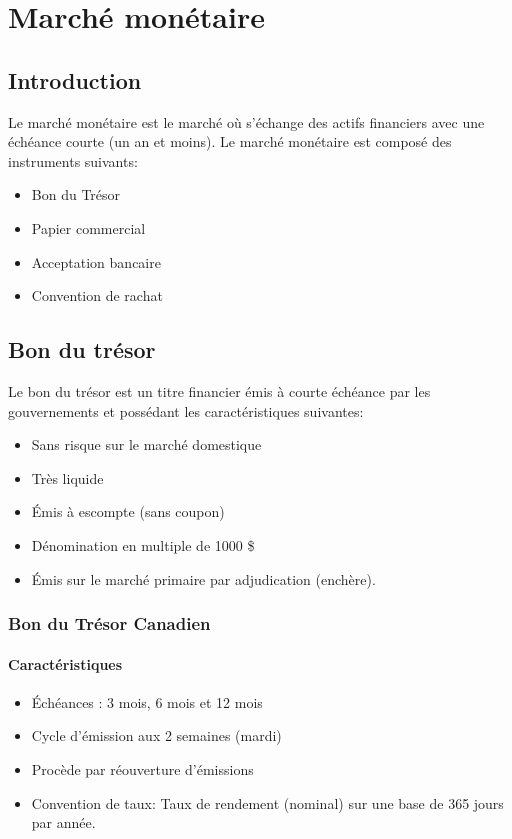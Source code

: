 \documentclass[12pt]{article}
\begin{document}
\chapter{Marché monétaire}
\section{Introduction}
Le marché monétaire est le marché où s’échange des actifs financiers avec une échéance courte (un an et moins).  Le marché monétaire est composé des instruments suivants:
\begin{itemize}
\item Bon du Trésor
\item Papier commercial
\item Acceptation bancaire
\item Convention de rachat
\end{itemize}
\section{Bon du trésor}
Le bon du trésor est un titre financier émis à courte échéance par les gouvernements et possédant les caractéristiques suivantes:
\begin{itemize}
\item Sans risque sur le marché domestique
\item Très liquide
\item Émis à escompte (sans coupon)
\item Dénomination en multiple de 1000 \$
\item Émis sur le marché primaire par adjudication (enchère).
\end{itemize}
\newpage
\subsection{Bon du Trésor Canadien}
\subsubsection{Caractéristiques}
\begin{itemize}
\item Échéances : 3 mois,  6 mois et 12 mois
\item Cycle d’émission aux 2 semaines (mardi)
\item Procède par réouverture d’émissions
\item Convention de taux: Taux de rendement (nominal) sur une base de 365 jours par année.
\end{itemize}
\end{document}
